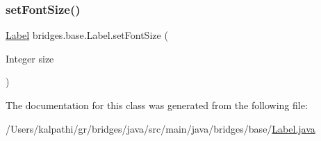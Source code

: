 \subsubsection{\texorpdfstring{setFontSize()}{setFontSize()}}
{\footnotesize\ttfamily \mbox{\hyperlink{classbridges_1_1base_1_1_label}{Label}} bridges.\+base.\+Label.\+set\+Font\+Size (\begin{DoxyParamCaption}\item[{Integer}]{size }\end{DoxyParamCaption})}



The documentation for this class was generated from the following file\+:\begin{DoxyCompactItemize}
\item 
/\+Users/kalpathi/gr/bridges/java/src/main/java/bridges/base/\mbox{\hyperlink{_label_8java}{Label.\+java}}\end{DoxyCompactItemize}
